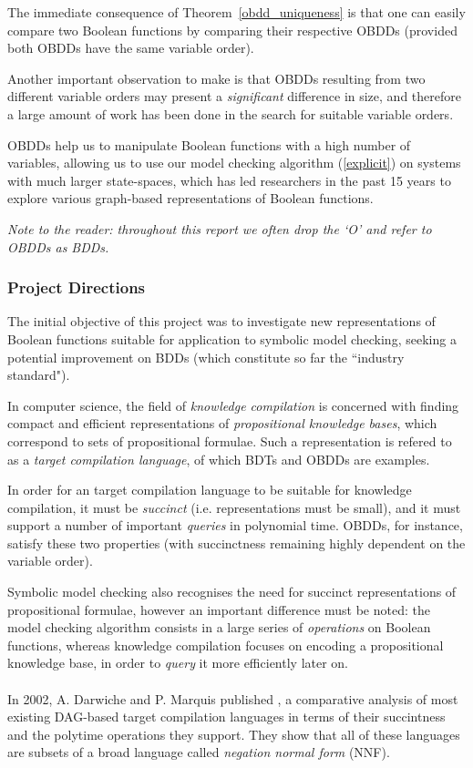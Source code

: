 \documentclass[11pt]{article}
\begin{document}
The immediate consequence of Theorem~\ref{obdd_uniqueness} is that one can easily compare two Boolean functions by comparing their respective OBDDs (provided both OBDDs have the same variable order). 

Another important observation to make is that OBDDs resulting from two different variable orders may present a \textit{significant }difference in size, and therefore a large amount of work has been done in the search for suitable variable orders. 

OBDDs help us to manipulate Boolean functions with a high number of variables, allowing us to use our model checking algorithm (\ref{explicit}) on systems with much larger state-spaces, which has led researchers in the past 15 years to explore various graph-based representations of Boolean functions.

\noindent\textit{Note to the reader: throughout this report we often drop the `O' and refer to OBDDs as BDDs.}

\subsubsection{Project Directions}

The initial objective of this project was to investigate new representations of Boolean functions suitable for application to symbolic model checking, seeking a potential improvement on BDDs (which constitute so far the ``industry standard").

In computer science, the field of \textit{knowledge compilation} is concerned with finding compact and efficient representations of \textit{propositional knowledge bases}, which correspond to sets of propositional formulae.
Such a representation is refered to as a \textit{target compilation language}, of which BDTs and OBDDs are examples. 
 
In order for an target compilation language to be suitable for knowledge compilation, it must be \textit{succinct} (i.e. representations must be small), and it must support a number of important \textit{queries} in polynomial time. OBDDs, for instance, satisfy these two properties (with succinctness remaining highly dependent on the variable order).

Symbolic model checking also recognises the need for succinct representations of propositional formulae, however an important difference must be noted: the model checking algorithm consists in a large series of \textit{operations} on Boolean functions, whereas knowledge compilation focuses on encoding a propositional knowledge base, in order to \textit{query} it more efficiently later on. 
\\\\
 In 2002, A. Darwiche and P. Marquis published \cite{compilation_map}, a comparative analysis of most existing DAG-based target compilation languages in terms of their succintness and the polytime operations they support. They show that all of these languages are subsets of a broad language called \textit{negation normal form} (NNF). 
\end{document}
